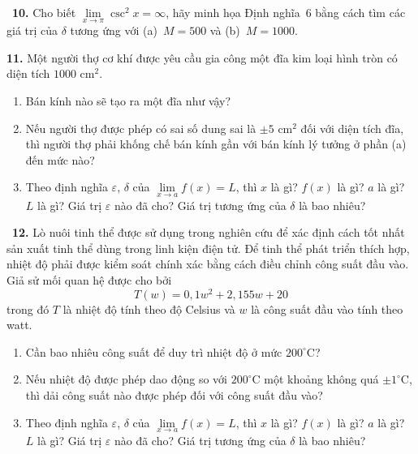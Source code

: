 \setcounter{page}{114}
\enlargethispage{2\baselineskip}

\noindent
\begin{minipage}[t]{0.48\textwidth}
\raggedright

\casicon\ \textbf{10.} Cho biết $\lim\limits_{x \to \pi} \csc^2 x = \infty$, hãy minh họa Định nghĩa~6 bằng cách tìm các giá trị của $\delta$ tương ứng với (a)~$M = 500$ và (b)~$M = 1000$.

\vspace{2pt}
\textbf{11.} Một người thợ cơ khí được yêu cầu gia công một đĩa kim loại hình tròn có diện tích $1000\text{ cm}^2$.
\begin{enumerate}[label=(\alph*), leftmargin=1.5em, topsep=1pt, itemsep=0.5pt, parsep=0pt]
  \item Bán kính nào sẽ tạo ra một đĩa như vậy?
  \item Nếu người thợ được phép có sai số dung sai là $\pm 5\text{ cm}^2$ đối với diện tích đĩa, thì người thợ phải khống chế bán kính gần với bán kính lý tưởng ở phần (a) đến mức nào?
  \item Theo định nghĩa $\varepsilon$, $\delta$ của $\lim\limits_{x \to a} f(x) = L$, thì $x$ là gì? $f(x)$ là gì? $a$ là gì? $L$ là gì? Giá trị $\varepsilon$ nào đã cho? Giá trị tương ứng của $\delta$ là bao nhiêu?
\end{enumerate}

\vspace{2pt}
\casicon\ \textbf{12.} Lò nuôi tinh thể được sử dụng trong nghiên cứu để xác định cách tốt nhất sản xuất tinh thể dùng trong linh kiện điện tử. Để tinh thể phát triển thích hợp, nhiệt độ phải được kiểm soát chính xác bằng cách điều chỉnh công suất đầu vào. Giả sử mối quan hệ được cho bởi
\[ T(w) = 0{,}1w^2 + 2{,}155w + 20 \]
trong đó $T$ là nhiệt độ tính theo độ Celsius và $w$ là công suất đầu vào tính theo watt.
\begin{enumerate}[label=(\alph*), leftmargin=1.5em, topsep=1pt, itemsep=0.5pt, parsep=0pt]
  \item Cần bao nhiêu công suất để duy trì nhiệt độ ở mức $200^\circ\text{C}$?
  \item Nếu nhiệt độ được phép dao động so với $200^\circ\text{C}$ một khoảng không quá $\pm 1^\circ\text{C}$, thì dải công suất nào được phép đối với công suất đầu vào?
  \item Theo định nghĩa $\varepsilon$, $\delta$ của $\lim\limits_{x \to a} f(x) = L$, thì $x$ là gì? $f(x)$ là gì? $a$ là gì? $L$ là gì? Giá trị $\varepsilon$ nào đã cho? Giá trị tương ứng của $\delta$ là bao nhiêu?
\end{enumerate}


\end{minipage}
